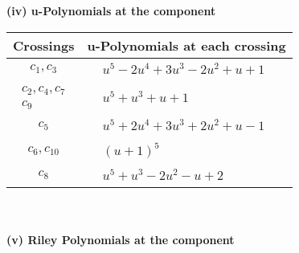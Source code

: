 \documentclass[1p]{elsarticle_modified}
\theoremstyle{definition}
\begin{document}
\newpage\renewcommand{\arraystretch}{1}
\flushleft \textbf{(iv) u-Polynomials at the component}\newline \\
\begin{tabular}{m{50pt}|m{274pt}}
Crossings & \hspace{64pt}u-Polynomials at each crossing \\
\hline $$\begin{aligned}c_{1},c_{3}\end{aligned}$$&$\begin{aligned}
&u^5-2 u^4+3 u^3-2 u^2+u+1
\end{aligned}$\\
\hline $$\begin{aligned}c_{2},c_{4},c_{7}\\c_{9}\end{aligned}$$&$\begin{aligned}
&u^5+u^3+u+1
\end{aligned}$\\
\hline $$\begin{aligned}c_{5}\end{aligned}$$&$\begin{aligned}
&u^5+2 u^4+3 u^3+2 u^2+u-1
\end{aligned}$\\
\hline $$\begin{aligned}c_{6},c_{10}\end{aligned}$$&$\begin{aligned}
&(u+1)^5
\end{aligned}$\\
\hline $$\begin{aligned}c_{8}\end{aligned}$$&$\begin{aligned}
&u^5+u^3-2 u^2- u+2
\end{aligned}$\\
\hline
\end{tabular}\\~\\
\newpage\renewcommand{\arraystretch}{1}
\flushleft \textbf{(v) Riley Polynomials at the component}\newline \\
\end{document}

